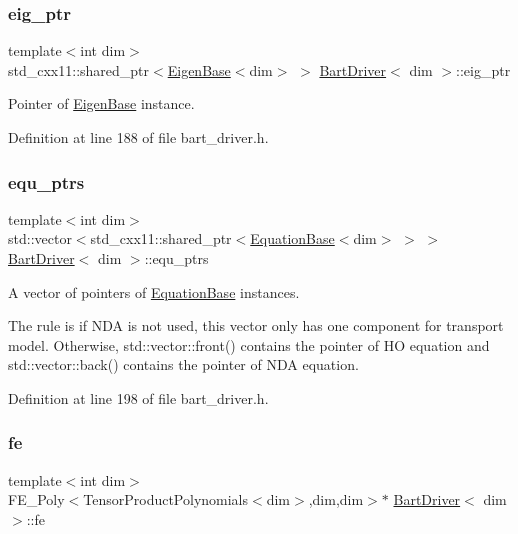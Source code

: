 \subsubsection{\texorpdfstring{eig\+\_\+ptr}{eig\_ptr}}
{\footnotesize\ttfamily template$<$int dim$>$ \\
std\+\_\+cxx11\+::shared\+\_\+ptr$<$\hyperlink{class_eigen_base}{Eigen\+Base}$<$dim$>$ $>$ \hyperlink{class_bart_driver}{Bart\+Driver}$<$ dim $>$\+::eig\+\_\+ptr\hspace{0.3cm}{\ttfamily [private]}}



Pointer of \hyperlink{class_eigen_base}{Eigen\+Base} instance. 



Definition at line 188 of file bart\+\_\+driver.\+h.

\mbox{\label{class_bart_driver_a0a6f52aed8e9c22da12a99653d1acba8}} 
\subsubsection{\texorpdfstring{equ\+\_\+ptrs}{equ\_ptrs}}
{\footnotesize\ttfamily template$<$int dim$>$ \\
std\+::vector$<$std\+\_\+cxx11\+::shared\+\_\+ptr$<$\hyperlink{class_equation_base}{Equation\+Base}$<$dim$>$ $>$ $>$ \hyperlink{class_bart_driver}{Bart\+Driver}$<$ dim $>$\+::equ\+\_\+ptrs\hspace{0.3cm}{\ttfamily [private]}}



A vector of pointers of \hyperlink{class_equation_base}{Equation\+Base} instances. 

The rule is if N\+DA is not used, this vector only has one component for transport model. Otherwise, std\+::vector\+::front() contains the pointer of HO equation and std\+::vector\+::back() contains the pointer of N\+DA equation. 

Definition at line 198 of file bart\+\_\+driver.\+h.

\mbox{\label{class_bart_driver_ac2e63d4ab8a403649e19f4b1acf94c04}} 
\subsubsection{\texorpdfstring{fe}{fe}}
{\footnotesize\ttfamily template$<$int dim$>$ \\
F\+E\+\_\+\+Poly$<$Tensor\+Product\+Polynomials$<$dim$>$,dim,dim$>$$\ast$ \hyperlink{class_bart_driver}{Bart\+Driver}$<$ dim $>$\+::fe\hspace{0.3cm}{\ttfamily [private]}}



